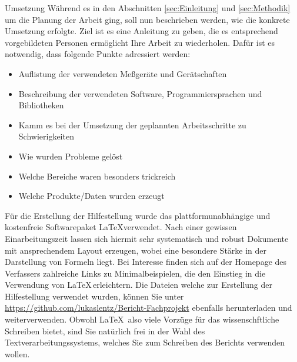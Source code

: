 %
\begin{simplebox}{Umsetzung}
%
Während es in den Abschnitten \ref{sec:Einleitung} und \ref{sec:Methodik} um die Planung der Arbeit ging, soll nun beschrieben werden, wie die konkrete Umsetzung erfolgte.
Ziel ist es eine Anleitung zu geben, die es entsprechend vorgebildeten Personen ermöglicht Ihre Arbeit zu wiederholen.
Dafür ist es notwendig, dass folgende Punkte adressiert werden:

%
\begin{itemize}
\item Auflistung der verwendeten Meßgeräte und Gerätschaften
\item Beschreibung der verwendeten Software, Programmiersprachen und Bibliotheken 
\item Kamm es bei der Umsetzung der geplannten Arbeitsschritte zu Schwierigkeiten
\item Wie wurden Probleme gelöst
\item Welche Bereiche waren besonders trickreich
\item Welche Produkte/Daten wurden erzeugt
\end{itemize}
%
\end{simplebox}
%
Für die Erstellung der Hilfestellung wurde das  plattformunabhängige und kostenfreie Softwarepaket \LaTeX verwendet.
Nach einer gewissen Einarbeitungszeit lassen sich hiermit sehr systematisch und robust Dokumente mit ansprechendem Layout erzeugen, wobei eine besondere Stärke in der Darstellung von Formeln liegt.
Bei Interesse finden sich auf der Homepage des Verfassers zahlreiche Links zu Minimalbeispielen, die den Einstieg in die Verwendung von \LaTeX\,erleichtern.
Die Dateien welche zur Erstellung der Hilfestellung verwendet wurden, können Sie unter \url{https://github.com/lukaslentz/Bericht-Fachprojekt} ebenfalls herunterladen und weiterverwenden.
Obwohl \LaTeX\, also viele Vorzüge für das wissenschftliche Schreiben bietet, sind Sie natürlich frei in der Wahl des Textverarbeitungssystems, welches Sie zum Schreiben des Berichts verwenden wollen. 
%